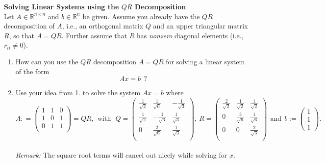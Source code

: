 \textbf{Solving Linear Systems using the $QR$ Decomposition}\\
Let $A \in \mathbb{R}^{n \times n}$ and $b\in\mathbb{R}^{n}$ be given. Assume you already have the $QR$ decomposition of $A$, i.e., an orthogonal matrix $Q$ and an upper triangular matrix $R$, so that $A = QR$. Further assume that $R$ has \textit{nonzero} diagonal elements (i.e., $r_{ii}\neq 0$).
\begin{enumerate}
	\item How can you use the $QR$ decomposition $A = QR$ for solving a linear system of the form
	$$Ax = b~~ ?$$
	\item Use your idea from 1. to solve the system $Ax = b$ where
	$$A: =
	\begin{pmatrix}
		1 & 1 & 0 \\
	    1 & 0 & 1 \\
		0 & 1 & 1 \\
	\end{pmatrix} = QR,~~ \text{with}~~~
	Q=
	\begin{pmatrix}
	\frac{1}{\sqrt{2}} &\frac{1}{\sqrt{6}} & -\frac{1}{\sqrt{3}} \\
	\frac{1}{\sqrt{2}} & -\frac{1}{\sqrt{6}} & \frac{1}{\sqrt{3}}\\
	0 & \frac{2}{\sqrt{6}} & \frac{1}{\sqrt{3}} \\
	\end{pmatrix},~
	R =
	\begin{pmatrix}
	\frac{2}{\sqrt{2}} & \frac{1}{\sqrt{2}} & \frac{1}{\sqrt{2}} \\
	0 & \frac{3}{\sqrt{6}} & \frac{1}{\sqrt{6}} \\
	0 & 0 & \frac{2}{\sqrt{3}} \\
	\end{pmatrix}~~\text{and}~
	~b := \begin{pmatrix}
	1 \\ 1\\1
\end{pmatrix} .	$$
~\\
\textit{Remark:} The square root terms will cancel out nicely while solving for $x$.
\end{enumerate}